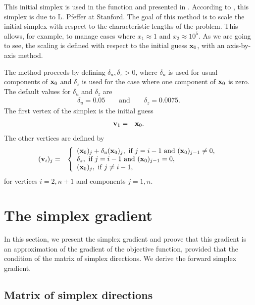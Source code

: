 This initial simplex is used in the function 
and presented in \cite{Fan2002}. According to \cite{Fan2002}, this simplex is due to L. Pfeffer at Stanford.
The goal of this method is to scale the initial simplex with respect 
to the characteristic lengths of the problem. This allows, for example,
to manage cases where $x_1\approx 1$ and $x_2\approx 10^5$.
As we are going to see, the scaling is defined with respect to the 
initial guess $\mathbf{x}_0$, with an axis-by-axis method.

The method proceeds by defining $\delta_u,\delta_z>0$, where 
$\delta_u$ is used for usual components of $\mathbf{x}_0$ and $\delta_z$ is 
used for the case where one component of $\mathbf{x}_0$ is zero.
The default values for $\delta_u$ and $\delta_z$ are 
\begin{eqnarray}
\delta_u = 0.05 \qquad \textrm{and} \qquad \delta_z = 0.0075.
\end{eqnarray}
The first vertex of the simplex is the initial guess 
\begin{eqnarray}
\mathbf{v}_1 &=& \mathbf{x}_0.
\end{eqnarray}
The other vertices are defined by 
\begin{eqnarray}
(\mathbf{v}_i)_j &=& \left\{
\begin{array}{l}
(\mathbf{x}_0)_j + \delta_u (\mathbf{x}_0)_j, \textrm{ if } j=i-1 \textrm{ and } (\mathbf{x}_0)_{j-1}\neq 0,\\
\delta_z, \textrm{ if } j=i-1 \textrm{ and } (\mathbf{x}_0)_{j-1}= 0,\\
(\mathbf{x}_0)_j, \textrm{ if } j\neq i-1,\\
\end{array}
\right.
\end{eqnarray}
for vertices $i=2,n+1$ and components $j=1,n$.

\section{The simplex gradient}
\label{section-simplexgradient}

In this section, we present the simplex gradient and proove 
that this gradient is an approximation of the gradient of the 
objective function, provided that the condition of the matrix 
of simplex directions. We derive the forward 
simplex gradient.

\subsection{Matrix of simplex directions}

